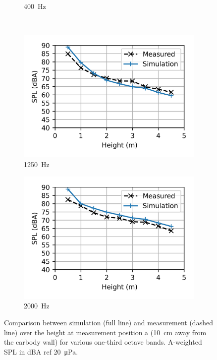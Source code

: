 \begin{figure}
\begin{subfigure}[b]{0.49\textwidth}
		\caption{\SI{400}{\hertz}}
	\end{subfigure}
	\\
	\begin{subfigure}[b]{0.49\textwidth}
		\centering
		\includegraphics{fig/chap5/initial_model/third_octave_over_height/1250_Hz.png}
		\caption{\SI{1250}{\hertz}}
	\end{subfigure}
	\hfill
	\begin{subfigure}[b]{0.49\textwidth}
		\centering
		\includegraphics{fig/chap5/initial_model/third_octave_over_height/2000_Hz.png}
		\caption{\SI{2000}{\hertz}}
	\end{subfigure}
        \caption{Comparison between simulation (full line) and measurement (dashed line) over the height at measurement position a (\SI{10}{\centi\meter} away from the carbody wall) for various one-third octave bands. A-weighted SPL in dBA ref \SI{20}{\micro\pascal}.}
	\label{fig:third_octave_over_height}
\end{figure}

